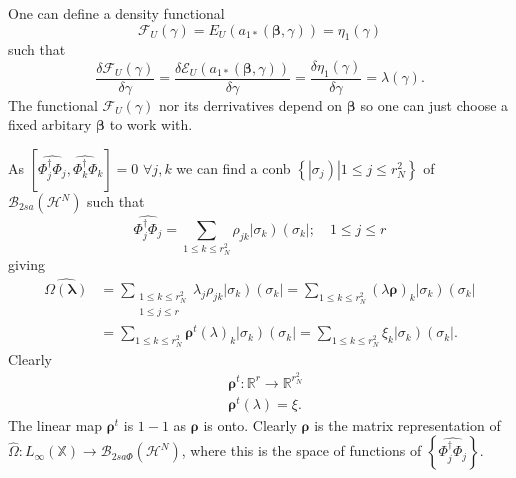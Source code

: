 \documentclass[aps,preprint]{revtex4}%
\begin{document}
One can define a density functional
\begin{equation}
\mathcal{F}_{U}\left(  \gamma\right)  =E_{U}\left(  a_{1\ast}\left(
\mathbf{\beta,}\gamma\right)  \right)  =\eta_{1}\left(  \gamma\right)
\end{equation}
such that
\begin{equation}
\frac{\delta\mathcal{F}_{U}\left(  \gamma\right)  }{\delta\gamma}=\frac
{\delta\mathcal{E}_{U}\left(  a_{1\ast}\left(  \mathbf{\beta,}\gamma\right)
\right)  }{\delta\gamma}=\frac{\delta\eta_{1}\left(  \gamma\right)  }%
{\delta\gamma}=\lambda\left(  \gamma\right)  .
\end{equation}
The functional $\mathcal{F}_{U}\left(  \gamma\right)  $ nor its derrivatives
depend on $\mathbf{\beta}$ so one can just choose a fixed arbitary
$\mathbf{\beta}$ to work with.

As $\left[  \widehat{\Phi_{j}^{\dagger}\Phi_{j}}\widehat{,\Phi_{k}^{\dagger
}\Phi_{k}}\right]  =0$ $\forall j,k$ we can find a conb $\left\{  \left.
\left\vert \sigma_{j}\right)  \right\vert 1\leq j\leq r_{N}^{2}\right\}  $ of
$\mathcal{B}_{2sa}\left(  \mathcal{H}^{N}\right)  $ such that
\begin{equation}
\widehat{\Phi_{j}^{\dagger}\Phi_{j}}=\sum_{1\leq k\leq r_{N}^{2}}\rho
_{jk}\left\vert \sigma_{k}\right)  \left(  \sigma_{k}\right\vert ;\quad1\leq
j\leq r
\end{equation}
giving
\begin{align}
\widehat{\Omega\left(  \mathbf{\lambda}\right)  }  &  =\sum_{\substack{1\leq
k\leq r_{N}^{2}\\1\leq j\leq r}}\lambda_{j}\rho_{jk}\left\vert \sigma
_{k}\right)  \left(  \sigma_{k}\right\vert =\sum_{1\leq k\leq r_{N}^{2}%
}\left(  \lambda\mathbf{\rho}\right)  _{k}\left\vert \sigma_{k}\right)
\left(  \sigma_{k}\right\vert \nonumber\\
&  =\sum_{1\leq k\leq r_{N}^{2}}\mathbf{\rho}^{t}\left(  \lambda\right)
_{k}\left\vert \sigma_{k}\right)  \left(  \sigma_{k}\right\vert =\sum_{1\leq
k\leq r_{N}^{2}}\xi_{k}\left\vert \sigma_{k}\right)  \left(  \sigma
_{k}\right\vert .
\end{align}
Clearly
\begin{align}
&  \mathbf{\rho}^{t}:\mathbb{R}^{r}\rightarrow\mathbb{R}^{r_{N}^{2}%
}\nonumber\\
&  \mathbf{\rho}^{t}\left(  \lambda\right)  =\xi.
\end{align}
The linear map $\mathbf{\rho}^{t}$ is $1-1$ as $\mathbf{\rho}$ is onto.
Clearly $\mathbf{\rho}$ is the matrix representation of $\widehat{\Omega
}:L_{\infty}\left(  \mathbb{X}\right)  \rightarrow\mathcal{B}_{2sa\Phi}\left(
\mathcal{H}^{N}\right)  $, where this is the space of functions of $\left\{
\widehat{\Phi_{j}^{\dagger}\Phi_{j}}\right\}  .$
\end{document}
